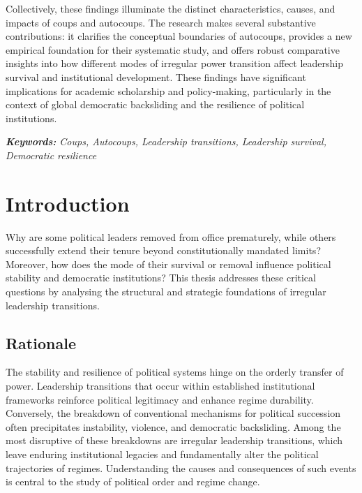 \documentclass[
  12pt,
]{report}
\begin{document}
Collectively, these findings illuminate the distinct characteristics,
causes, and impacts of coups and autocoups. The research makes several
substantive contributions: it clarifies the conceptual boundaries of
autocoups, provides a new empirical foundation for their systematic
study, and offers robust comparative insights into how different modes
of irregular power transition affect leadership survival and
institutional development. These findings have significant implications
for academic scholarship and policy-making, particularly in the context
of global democratic backsliding and the resilience of political
institutions.

\emph{\textbf{Keywords:} Coups, Autocoups, Leadership transitions,
Leadership survival, Democratic resilience}

\chapter{Introduction}\label{introduction}

Why are some political leaders removed from office prematurely, while
others successfully extend their tenure beyond constitutionally mandated
limits? Moreover, how does the mode of their survival or removal
influence political stability and democratic institutions? This thesis
addresses these critical questions by analysing the structural and
strategic foundations of irregular leadership transitions.

\section{Rationale}\label{rationale}

The stability and resilience of political systems hinge on the orderly
transfer of power. Leadership transitions that occur within established
institutional frameworks reinforce political legitimacy and enhance
regime durability. Conversely, the breakdown of conventional mechanisms
for political succession often precipitates instability, violence, and
democratic backsliding. Among the most disruptive of these breakdowns
are irregular leadership transitions, which leave enduring institutional
legacies and fundamentally alter the political trajectories of regimes.
Understanding the causes and consequences of such events is central to
the study of political order and regime change.
\end{document}
